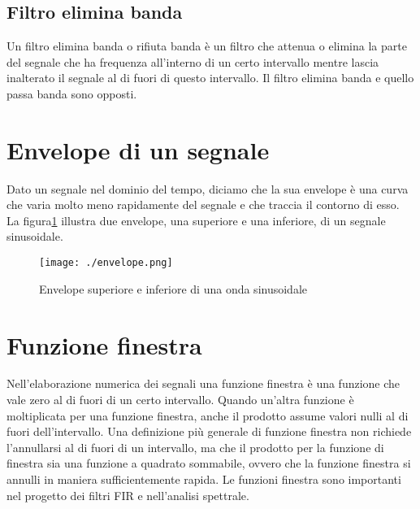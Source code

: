 \subsection{Filtro elimina banda}
Un filtro elimina banda o rifiuta banda \`e un filtro che attenua o elimina la parte del segnale che ha frequenza all'interno di un certo intervallo mentre lascia inalterato il segnale al di fuori di questo intervallo. Il filtro elimina banda e quello passa banda sono opposti.

\section{Envelope di un segnale}
\label{secSignalprocessingnvelope}

Dato un segnale nel dominio del tempo, diciamo che la sua envelope \`e una curva che varia molto meno rapidamente del segnale e che traccia il contorno di esso\cite{envelope}. La figura\ref{envelopeFig} illustra due envelope, una superiore e una inferiore, di un segnale sinusoidale.
\begin{figure}[h!]
 \centering
 \texttt{[image: ./envelope.png]}
  \label{envelopeFig}
\caption{Envelope superiore e inferiore di una onda sinusoidale\cite{envelopeImg}}
\end{figure}


\section{Funzione finestra}

Nell'elaborazione numerica dei segnali una funzione finestra \`e una funzione che vale zero al di fuori di un certo intervallo. Quando un'altra funzione \`e moltiplicata per una funzione finestra, anche il prodotto assume valori nulli al di fuori dell'intervallo. Una definizione pi\`u generale di funzione finestra non richiede l'annullarsi al di fuori di un intervallo, ma che il prodotto per la funzione di finestra sia una funzione a quadrato sommabile, ovvero che la funzione finestra si annulli in maniera sufficientemente rapida. Le funzioni finestra sono importanti nel progetto dei filtri FIR e nell'analisi spettrale. 

